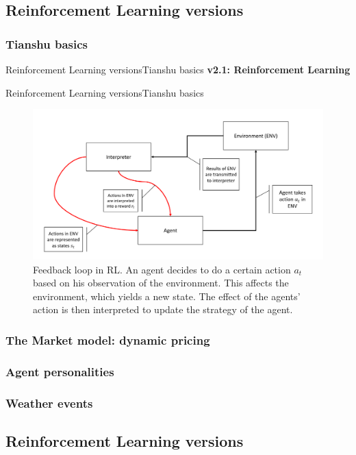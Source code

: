 \documentclass[10pt, aspectratio=169]{beamer}
\def\aac{The Market model: dynamic pricing}
\def\aad{Agent personalities}
\def\aae{Weather events}
\def\ab{Reinforcement Learning versions}
\def\aba{Tianshu basics}
\begin{document}
\subsection{\ab}
\subsubsection{\aba}

\begin{frame}{\ab}{\aba}
  \centering
  \textbf{v2.1: Reinforcement Learning}
\end{frame}


\begin{frame}{\ab}{\aba}
  \centering
    \begin{figure}
      \includegraphics[width = .8\textwidth]{Figures/RL schematic.PNG}
      \caption*{\tiny Feedback loop in RL. An agent decides to do a certain action $a_t$ based on his observation of the environment. This affects the environment, which yields a new state. The effect of the agents' action is then interpreted to update the strategy of the agent.}
    \end{figure}
\end{frame}


\subsubsection{\aac}
\subsubsection{\aad}
\subsubsection{\aae}

\subsection{\ab}
\end{document}
